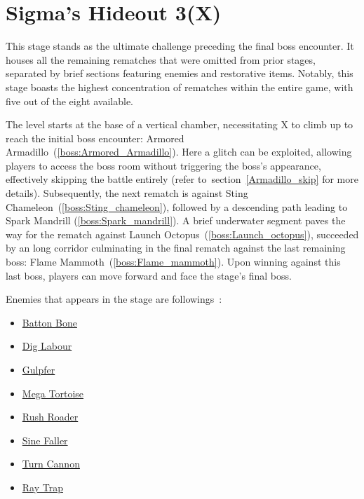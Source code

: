 \section{Sigma's Hideout 3(X)}
This stage stands as the ultimate challenge preceding the final boss encounter. It houses all the remaining rematches that were omitted from prior stages, separated by brief sections featuring enemies and restorative items. Notably, this stage boasts the highest concentration of rematches within the entire game, with five out of the eight available.

The level starts at the base of a vertical chamber, necessitating X to climb up to reach the initial boss encounter: Armored Armadillo~(\ref{boss:Armored_Armadillo}). Here a glitch can be exploited, allowing players to access the boss room without triggering the boss's appearance, effectively skipping the battle entirely (refer to~section~\ref{Armadillo_skip} for more details). Subsequently, the next rematch is against Sting Chameleon~(\ref{boss:Sting_chameleon}), followed by a descending path leading to Spark Mandrill (\ref{boss:Spark_mandrill}). A brief underwater segment paves the way for the rematch against Launch Octopus~(\ref{boss:Launch_octopus}), succeeded by an long corridor culminating in the final rematch against the last remaining boss: Flame Mammoth~(\ref{boss:Flame_mammoth}).
Upon winning against this last boss, players can move forward and face the stage's final boss.

Enemies that appears in the stage are followings~\cite{wiki:sigma_stages}:
\begin{itemize}
	\item \hyperlink{enem:Batton_Bone}{Batton Bone}
	\item \hyperlink{enem:Dig_Labour}{Dig Labour}
	\item \hyperlink{enem:Gulpfer}{Gulpfer}
	\item \hyperlink{enem:Mega_Tortoise}{Mega Tortoise}
	\item \hyperlink{enem:Rush_Roader}{Rush Roader}
	\item \hyperlink{enem:Sine_Faller}{Sine Faller}
	\item \hyperlink{enem:Turn_Cannon}{Turn Cannon}
	\item \hyperlink{enem:Ray_Trap}{Ray Trap}
\end{itemize} 

